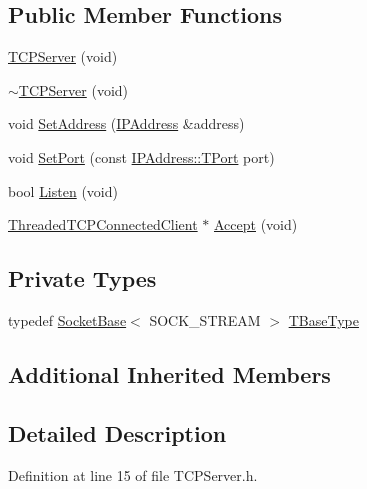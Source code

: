 \subsection*{Public Member Functions}
\begin{DoxyCompactItemize}
\item 
\hyperlink{class_t_c_p_server_ad764ce120c77624cf1c3436ff154dd7a}{T\-C\-P\-Server} (void)
\item 
\hyperlink{class_t_c_p_server_ab8524656d788731d2350f50c6174554e}{$\sim$\-T\-C\-P\-Server} (void)
\item 
void \hyperlink{class_t_c_p_server_a85bb8272c9599d98bcb28e4156a755fb}{Set\-Address} (\hyperlink{class_i_p_address}{I\-P\-Address} \&address)
\item 
void \hyperlink{class_t_c_p_server_a8d5ad30ba42960a84973b57f74a853fa}{Set\-Port} (const \hyperlink{class_i_p_address_a51188195685c31d4258c0a078cc37154}{I\-P\-Address\-::\-T\-Port} port)
\item 
bool \hyperlink{class_t_c_p_server_a2d424428c9107b8b40905f0aefc7d30b}{Listen} (void)
\item 
\hyperlink{class_threaded_t_c_p_connected_client}{Threaded\-T\-C\-P\-Connected\-Client} $\ast$ \hyperlink{class_t_c_p_server_ae53980fd5e4791bc6e5e15c97a1a796a}{Accept} (void)
\end{DoxyCompactItemize}
\subsection*{Private Types}
\begin{DoxyCompactItemize}
\item 
typedef \hyperlink{class_socket_base}{Socket\-Base}$<$ S\-O\-C\-K\-\_\-\-S\-T\-R\-E\-A\-M $>$ \hyperlink{class_t_c_p_server_aed13a25d9b432da0be24ade2206a0914}{T\-Base\-Type}
\end{DoxyCompactItemize}
\subsection*{Additional Inherited Members}


\subsection{Detailed Description}


Definition at line 15 of file T\-C\-P\-Server.\-h.



